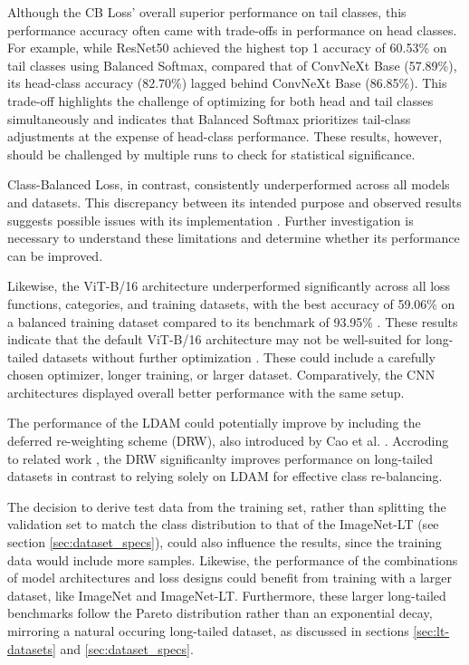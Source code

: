 Although the CB Loss' overall superior performance on tail classes, this performance accuracy often came with trade-offs in performance on head classes. For example, while ResNet50 achieved the highest top 1 accuracy of 60.53\% on tail classes using Balanced Softmax, compared that of ConvNeXt Base (57.89\%), its head-class accuracy (82.70\%) lagged behind ConvNeXt Base (86.85\%). This trade-off highlights the challenge of optimizing for both head and tail classes simultaneously and indicates that Balanced Softmax prioritizes tail-class adjustments at the expense of head-class performance. These results, however, should be challenged by multiple runs to check for statistical significance.

Class-Balanced Loss, in contrast, consistently underperformed across all models and datasets. This discrepancy between its intended purpose and observed results suggests possible issues with its implementation . Further investigation is necessary to understand these limitations and determine whether its performance can be improved. 

Likewise, the ViT-B/16 architecture underperformed significantly across all loss functions, categories, and training datasets, with the best accuracy of 59.06\% on a balanced training dataset compared to its benchmark of 93.95\% . These results indicate that the default ViT-B/16 architecture may not be well-suited for long-tailed datasets without further optimization \cite{menon2021longtaillearninglogitadjustment,loshchilov2018fixing}. These could include a carefully chosen optimizer, longer training, or larger dataset. Comparatively, the CNN architectures displayed overall better performance with the same setup.

The performance of the LDAM could potentially improve by including the deferred re-weighting scheme (DRW), also introduced by Cao et al. \cite{cao2019learningimbalanceddatasetslabeldistributionaware}. Accroding to related work , the DRW significanlty improves performance on long-tailed datasets in contrast to relying solely on LDAM for effective class re-balancing. 

The decision to derive test data from the training set, rather than splitting the validation set to match the class distribution to that of the ImageNet-LT (see section \ref{sec:dataset_specs}), could also influence the results, since the training data would include more samples. Likewise, the performance of the combinations of model architectures and loss designs could benefit from training with a larger dataset, like ImageNet and ImageNet-LT. Furthermore, these larger long-tailed benchmarks follow the Pareto distribution rather than an exponential decay, mirroring a natural occuring long-tailed dataset, as discussed in sections \ref{sec:lt-datasets} and \ref{sec:dataset_specs}.  

